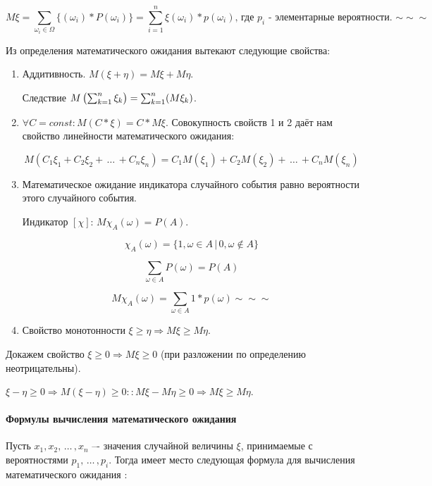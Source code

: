 \documentclass[a4paper,12pt]{report}
\newcommand{\sudots}{\,\ldots\,}
\begin{document}
	$$
	  M\xi = \sum_{\omega_i \in \Omega}\{(\omega_i)*P(\omega_i)\} 
	       = \sum^n_{i=1}\xi(\omega_i)*p(\omega_i)
	       \mbox{, где $p_i$ - элементарные вероятности. $\sim\sim\sim$}
	$$

	Из определения математического ожидания вытекают следующие свойства:


	\begin{enumerate}

	\item	Аддитивность. $M(\xi + \eta) = M\xi + M\eta$. 

		Следствие $M\left(\sum^n_{k=1}\strut\xi_k\right)=\sum^n_{k=1}(M\xi_k)$.


	\item	$\forall C = const: M(C*\xi) = C*M\xi$. Совокупность свойств 1 и 2 даёт нам свойство линейности математического ожидания:

	$$
	  M(C_1\xi_1 + C_2\xi_2 + \sudots + C_n\xi_n) 
	    = C_1M(\xi_1) + C_2M(\xi_2) + \sudots + C_nM(\xi_n)
	$$


	\item	Математическое ожидание индикатора случайного события равно вероятности этого случайного события. 

	Индикатор $[\chi]$: $M\chi_A (\omega) = P(A)$. 

		$$
		  \chi_A(\omega) = \{1, \omega \in A \,|\, 0, \omega \not\in A\}
		$$

		$$
		  \sum_{\omega \in A}P(\omega) = P(A)
		$$

		$$
		  M\chi_A(\omega) = \sum_{\omega \in A}1*p(\omega) \sim\sim\sim
		$$

	
	\item	Свойство монотонности $\xi \geqslant \eta \Rightarrow M\xi \geqslant M\eta$.

	\end{enumerate}


	Докажем свойство $\xi \geqslant 0 \Rightarrow M\xi \geqslant 0$ (при разложении по определению неотрицательны).


	$\xi - \eta \geqslant 0 \Rightarrow M(\xi - \eta) \geqslant 0 
	  :: M\xi - M\eta \geqslant 0 \Rightarrow M\xi \geqslant M\eta$.



\paragraph{Формулы вычисления математического ожидания}

	Пусть $x_1,x_2, \sudots ,x_n$ –-  значения случайной величины $\xi$, принимаемые с вероятностями $p_1, \sudots ,p_i$. Тогда имеет место следующая формула для вычисления математического ожидания :
\end{document}
